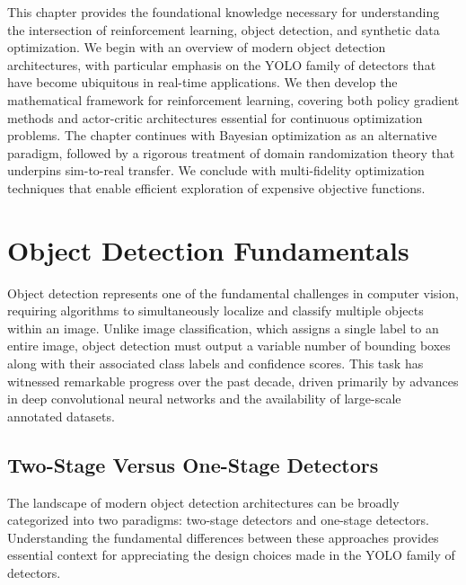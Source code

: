 

This chapter provides the foundational knowledge necessary for understanding the intersection of reinforcement learning, object detection, and synthetic data optimization. We begin with an overview of modern object detection architectures, with particular emphasis on the YOLO family of detectors that have become ubiquitous in real-time applications. We then develop the mathematical framework for reinforcement learning, covering both policy gradient methods and actor-critic architectures essential for continuous optimization problems. The chapter continues with Bayesian optimization as an alternative paradigm, followed by a rigorous treatment of domain randomization theory that underpins sim-to-real transfer. We conclude with multi-fidelity optimization techniques that enable efficient exploration of expensive objective functions.

\section{Object Detection Fundamentals}
\label{sec:object_detection}

Object detection represents one of the fundamental challenges in computer vision, requiring algorithms to simultaneously localize and classify multiple objects within an image. Unlike image classification, which assigns a single label to an entire image, object detection must output a variable number of bounding boxes along with their associated class labels and confidence scores. This task has witnessed remarkable progress over the past decade, driven primarily by advances in deep convolutional neural networks and the availability of large-scale annotated datasets.

\subsection{Two-Stage Versus One-Stage Detectors}
\label{subsec:two_vs_one_stage}

The landscape of modern object detection architectures can be broadly categorized into two paradigms: two-stage detectors and one-stage detectors. Understanding the fundamental differences between these approaches provides essential context for appreciating the design choices made in the YOLO family of detectors.

